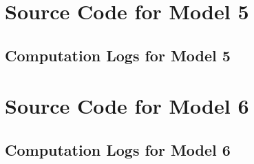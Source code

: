 \newpage
\section{Source Code for Model 5}


\begin{landscape}
    \section{Computation Logs for Model 5}
    
\end{landscape}


\newpage
\section{Source Code for Model 6}


\newpage
\begin{landscape}
    \section{Computation Logs for Model 6}
    
\end{landscape}

% 

%     

